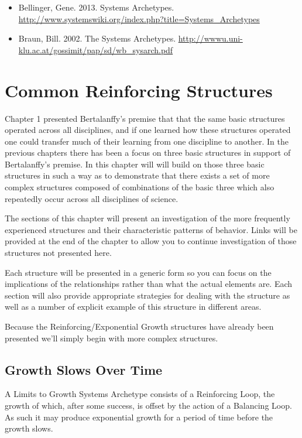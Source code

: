 \documentclass[]{memoir}
\begin{document}
\begin{itemize}
\itemsep1pt\parskip0pt
\item
  Bellinger, Gene. 2013. Systems Archetypes.
  \url{http://www.systemswiki.org/index.php?title=Systems_Archetypes}
\item
  Braun, Bill. 2002. The Systems Archetypes.
  \url{http://wwwu.uni-klu.ac.at/gossimit/pap/sd/wb_sysarch.pdf}
\end{itemize}

\chapter{Common Reinforcing Structures}

Chapter 1 presented Bertalanffy's premise that that the same basic
structures operated across all disciplines, and if one learned how these
structures operated one could transfer much of their learning from one
discipline to another. In the previous chapters there has been a focus
on three basic structures in support of Bertalanffy's premise. In this
chapter will will build on those three basic structures in such a way as
to demonstrate that there exists a set of more complex structures
composed of combinations of the basic three which also repeatedly occur
across all disciplines of science.

The sections of this chapter will present an investigation of the more
frequently experienced structures and their characteristic patterns of
behavior. Links will be provided at the end of the chapter to allow you
to continue investigation of those structures not presented here.

Each structure will be presented in a generic form so you can focus on
the implications of the relationships rather than what the actual
elements are. Each section will also provide appropriate strategies for
dealing with the structure as well as a number of explicit example of
this structure in different areas.

Because the Reinforcing/Exponential Growth structures have already been
presented we'll simply begin with more complex structures.

\section{Growth Slows Over Time}

A Limits to Growth Systems Archetype consists of a Reinforcing Loop, the
growth of which, after some success, is offset by the action of a
Balancing Loop. As such it may produce exponential growth for a period
of time before the growth slows.
\end{document}
